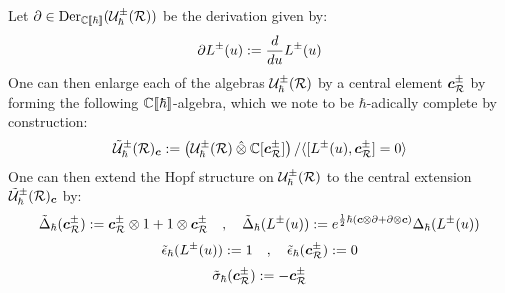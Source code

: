\begin{remark}
            Let $\partial \in \operatorname{Der}_{\mathbb{C}[\![\hbar]\!]}( \mathcal{U}^{\pm}_{\hbar}(\mathcal{R}) )$ be the derivation given by:
                $$\partial L^{\pm}(u) := \frac{d}{du} L^{\pm}(u)$$
            One can then enlarge each of the algebras $\mathcal{U}^{\pm}_{\hbar}(\mathcal{R})$ by a central element $\boldsymbol{c}_{\mathcal{R}}^{\pm}$ by forming the following $\mathbb{C}[\![\hbar]\!]$-algebra, which we note to be $\hbar$-adically complete by construction:
                $$\tilde{\calU}^{\pm}_{\hbar}(\calR)_{\level} := \left( \calU^{\pm}_{\hbar}(\calR) \hattensor \bbC[\level_{\calR}^{\pm}] \right)/\< [L^{\pm}(u), \level_{\calR}^{\pm}] = 0 \>$$
            One can then extend the Hopf structure on $\mathcal{U}^{\pm}_{\hbar}(\mathcal{R})$ to the central extension $\tilde{\mathcal{U}}^{\pm}_{\hbar}(\mathcal{R})_{\boldsymbol{c}}$ by:
                \begin{equation} \label{equation: centrally_extended_loop_QUEs_coproducts}
                    \tilde{\Delta}_{\hbar}(\level_{\calR}^{\pm}) := \level_{\calR}^{\pm} \tensor 1 + 1 \tensor \level_{\calR}^{\pm} \quad, \quad \tilde{\Delta}_{\hbar}( L^{\pm}(u) ) := e^{\frac12 \hbar (\level \tensor \del + \del \tensor \level)} \Delta_{\hbar}( L^{\pm}(u) )
                \end{equation}
                \begin{equation} \label{equation: centrally_extended_loop_QUEs_counit}
                    \tilde{\epsilon}_{\hbar}( L^{\pm}(u) ) := 1 \quad, \quad \tilde{\epsilon}_{\hbar}( \boldsymbol{c}_{\mathcal{R}}^{\pm}) := 0
                \end{equation}
                \begin{equation} \label{equation: centrally_extended_loop_QUEs_antipode}
                    \tilde{\sigma}_{\hbar}( \boldsymbol{c}_{\mathcal{R}}^{\pm} ) := -\boldsymbol{c}_{\mathcal{R}}^{\pm}
                \end{equation}
        \end{remark}
